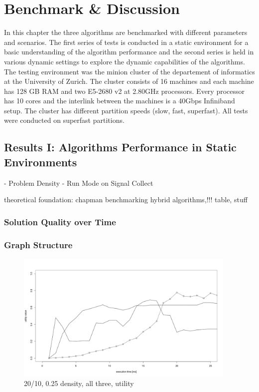 \chapter{Benchmark \& Discussion}

In this chapter the three algorithms are benchmarked with different parameters and scenarios. The first series of tests is conducted in a static environment for a basic understanding of the algorithm performance and the second series is held in various dynamic settings to explore the dynamic capabilities of the algorithms. The testing environment was the minion cluster of the departement of informatics at the University of Zurich. The cluster consists of 16 machines and each machine has 128 GB RAM and two E5-2680 v2 at 2.80GHz processors. Every processor has 10 cores and the interlink between the machines is a 40Gbps Infiniband setup. The cluster has different partition speeds (slow, fast, superfast). All tests were conducted on superfast partitions.

\section{Results I: Algorithms Performance in Static Environments}

- Problem Density
- Run Mode on Signal Collect

theoretical foundation: chapman benchmarking hybrid algorithms,!!! table, stuff

\subsection{Solution Quality over Time}

\subsection{Graph Structure}
\begin{figure}[H]
\includegraphics[width=400px]{graphics/experiments/static/quality/sq_1}
\centering
\caption{20/10, 0.25 density, all three, utility}
\label{fig:mgm_graph}
\end{figure}

